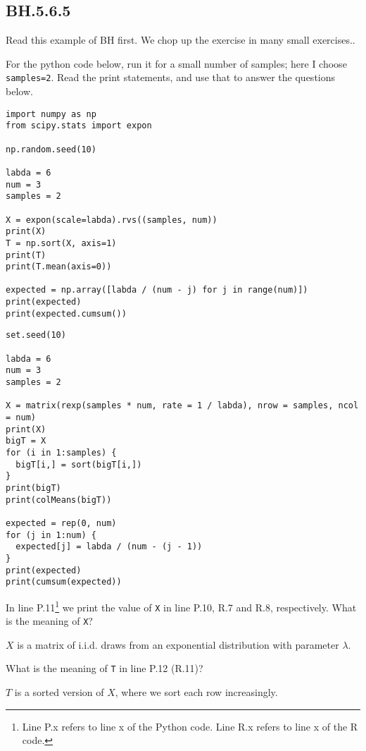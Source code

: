 \subsection{BH.5.6.5}
Read this example of BH first.
We chop up the exercise in many small exercises..


For the python code below, run it for a small number of samples; here I choose \texttt{samples=2}. Read the print statements, and use that to answer the questions below.

\begin{verbatim}
import numpy as np
from scipy.stats import expon

np.random.seed(10)

labda = 6
num = 3
samples = 2

X = expon(scale=labda).rvs((samples, num))
print(X)
T = np.sort(X, axis=1)
print(T)
print(T.mean(axis=0))

expected = np.array([labda / (num - j) for j in range(num)])
print(expected)
print(expected.cumsum())
\end{verbatim}


\begin{verbatim}
set.seed(10)

labda = 6
num = 3
samples = 2

X = matrix(rexp(samples * num, rate = 1 / labda), nrow = samples, ncol = num)
print(X)
bigT = X
for (i in 1:samples) {
  bigT[i,] = sort(bigT[i,])
}
print(bigT)
print(colMeans(bigT))

expected = rep(0, num)
for (j in 1:num) {
  expected[j] = labda / (num - (j - 1))
}
print(expected)
print(cumsum(expected))
\end{verbatim}



\begin{exercise}
In line P.11\footnote{Line P.x refers to line x of the Python code.
  Line R.x refers to line x of the R code.}
we print the value of \texttt{X} in line P.10, R.7 and R.8, respectively.
What is the meaning of \texttt{X}?
\begin{solution}
$X$ is a matrix of i.i.d. draws from an exponential distribution with parameter $\lambda$.
\end{solution}
\end{exercise}

\begin{exercise}
What is the meaning of \texttt{T} in line P.12 (R.11)?
\begin{solution}
$T$ is a sorted version of $X$, where we sort each row increasingly.
\end{solution}
\end{exercise}



